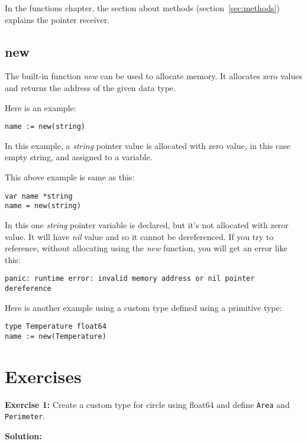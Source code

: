 In the functions chapter, the section about methods
(section~\ref{sec:methods}) explains the pointer receiver.

\subsection{new}

The built-in function \textit{new} can be used to allocate memory.  It
allocates zero values and returns the address of the given data type.

Here is an example:

\begin{lstlisting}[numbers=none]
name := new(string)
\end{lstlisting}

In this example, a \textit{string} pointer value is allocated with
zero value, in this case empty string, and assigned to a variable.

This above example is same as this:

\begin{lstlisting}[numbers=none]
var name *string
name = new(string)
\end{lstlisting}

In this one \textit{string} pointer variable is declared, but it's not
allocated with zeror value.  It will have \textit{nil} value and so it
cannot be dereferenced.  If you try to reference, without allocating
using the \textit{new} function, you will get an error like this:

\begin{lstlisting}[numbers=none]
panic: runtime error: invalid memory address or nil pointer
dereference
\end{lstlisting}

Here is another example using a custom type defined using a primitive
type:

\begin{lstlisting}[numbers=none]
type Temperature float64
name := new(Temperature)
\end{lstlisting}

\section{Exercises}

\textbf{Exercise 1:} Create a custom type for circle using float64
and define \texttt{Area} and \texttt{Perimeter}.

\textbf{Solution:}

